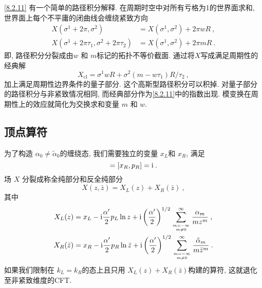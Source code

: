 \eqref{8.2.11} 有一个简单的路径积分解释. 在周期时空中对所有亏格为1的世界面求和, 世界面上每个不平庸的闭曲线会缠绕紧致方向
\begin{subequations} \label{8.2.12}
\begin{align}
X(\sigma^{1}+2 \pi, \sigma^{2}) &= X(\sigma^{1}, \sigma^{2})+2 \pi w R \:, \label{8.2.12a} \\
X(\sigma^{1}+2 \pi \tau_{1}, \sigma^{2}+2 \pi \tau_{2}) &= X(\sigma^{1}, \sigma^{2})+2 \pi m R \:. \label{8.2.12b} 
\end{align}
\end{subequations}
即, 路径积分分裂成由$w$ 和 $m $标记的拓扑不等价截面. 通过将$X$写成满足周期性的经典解                                                                                                              
\begin{equation}
	X_{\mathrm{cl}}=\sigma^{1} w R+\sigma^{2}(m-w \tau_{1}) R / \tau_{2} \:, \label{8.2.13}
\end{equation}
加上满足周期性边界条件的量子部分. 这个高斯型路径积分可以积掉. 对量子部分的路径积分与非紧致情况相同, 而经典部分作为\eqref{8.2.11}中的指数出现. 
模变换在周期性上的效应就简化为交换求和变量 $m$ 和 $w$.

\subsection*{顶点算符}
为了构造 $\alpha_{0} \neq \tilde{\alpha}_{0}$的缠绕态, 我们需要独立的变量 $x_{L}$和 $x_{R}$, 满足
\begin{equation}
	[x_{L}, p_{L}]=[x_{R}, p_{R}]=\mi \:. \label{8.2.14}
\end{equation}
场 $X$ 分裂成称全纯部分和反全纯部分
\begin{equation}
	X(z, \bar{z})=X_{L}(z)+X_{R}(\bar{z}) \:, \label{8.2.15}
\end{equation}
其中
\begin{subequations} \label{8.2.16}
\begin{align}
X_{L}(z) &= x_{L}- \mathrm{i} \frac{\alpha^{\prime}}{2} p_{L} \ln z+\mathrm{i}\left(\frac{\alpha^{\prime}}{2}\right)^{1 / 2} 
			\sum_{m=-\infty \atop m \neq 0}^{\infty} \frac{\alpha_{m}}{m z^{m}} \:, \label{8.2.16a} \\
X_{R}(\bar{z})&= x_{R}-\mathrm{i} \frac{\alpha^{\prime}}{2} p_{R} \ln \bar{z}+\mathrm{i}\left(\frac{\alpha^{\prime}}{2}\right)^{1 / 2} 
\sum_{m=-\infty \atop m \neq 0}^{\infty} \frac{\tilde{\alpha}_{m}}{m \bar{z}^{m}} \:. \label{8.2.16b}
\end{align}
\end{subequations}
如果我们限制在 $k_{L}=k_{R}$的态上且只用 $X_{L}(z)+X_{R}(\bar{z})$构建的算符, 这就退化至非紧致维度的CFT.

